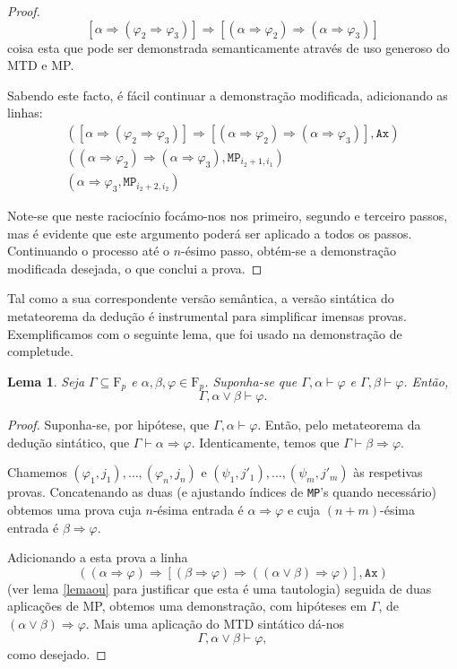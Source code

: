 \documentclass{report}
\newtheorem{lema}{Lema}
\theoremstyle{definition}
\theoremstyle{remark}
\newcommand{\F}{\mathrm{F}}
\newcommand{\imply}{\mathbin{\Rightarrow}}
\begin{document}
\begin{proof}
	\[[\alpha \imply (\varphi_2 \imply \varphi_3)] \imply [(\alpha \imply \varphi_2) \imply (\alpha \imply \varphi_3)]\]
	coisa esta que pode ser demonstrada semanticamente através de uso generoso do MTD e MP.
	
	Sabendo este facto, é fácil continuar a demonstração modificada, adicionando as linhas:
	\begin{gather*}
	([\alpha \imply (\varphi_2 \imply \varphi_3)] \imply [(\alpha \imply \varphi_2) \imply (\alpha \imply \varphi_3)], \texttt{Ax})\\
	((\alpha \imply \varphi_2) \imply (\alpha \imply \varphi_3), \texttt{MP}_{i_2 + 1, i_1})\\
	(\alpha \imply \varphi_3, \texttt{MP}_{i_2 + 2, i_2})
	\end{gather*}
	
	Note-se que neste raciocínio focámo-nos nos primeiro, segundo e terceiro passos, mas é evidente que este argumento poderá ser aplicado a todos os passos. Continuando o processo até o $n$-ésimo passo, obtém-se a demonstração modificada desejada, o que conclui a prova.
	\end{proof}
	
	Tal como a sua correspondente versão semântica, a versão sintática do metateorema da dedução é instrumental para simplificar imensas provas. Exemplificamos com o seguinte lema, que foi usado na demonstração de completude.
	
	\begin{lema}\label{lema:1}
	Seja $\Gamma \subseteq \F_p$ e $\alpha, \beta, \varphi \in \F_p$. Suponha-se que $\Gamma, \alpha \vdash \varphi$ e $\Gamma, \beta \vdash \varphi$. Então,
	\[\Gamma, \alpha \lor \beta \vdash \varphi.\]
	\end{lema}
	
	\begin{proof}
	Suponha-se, por hipótese, que $\Gamma, \alpha \vdash \varphi$. Então, pelo metateorema da dedução sintático, que $\Gamma \vdash \alpha \imply \varphi$. Identicamente, temos que $\Gamma \vdash \beta \imply \varphi$.
	
	Chamemos $(\varphi_1, j_1), \dots, (\varphi_n, j_n)$ e $(\psi_1, j'_1), \dots, (\psi_m, j'_m)$ às respetivas provas. Concatenando as duas (e ajustando índices de \texttt{MP}'s quando necessário) obtemos uma prova cuja $n$-ésima entrada é $\alpha \imply \varphi$ e cuja $(n+m)$-ésima entrada é $\beta \imply \varphi$.
	
	Adicionando a esta prova a linha
	\[((\alpha \imply \varphi) \imply [(\beta \imply \varphi) \imply ((\alpha \lor \beta) \imply \varphi)], \texttt{Ax})\]
	(ver lema \ref{lemaou} para justificar que esta é uma tautologia) seguida de duas aplicações de MP, obtemos uma demonstração, com hipóteses em $\Gamma$, de $(\alpha \lor \beta) \imply \varphi$. Mais uma aplicação do MTD sintático dá-nos
	\[\Gamma, \alpha \lor \beta \vdash \varphi,\]
	como desejado.
	\end{proof}
	
\end{document}
